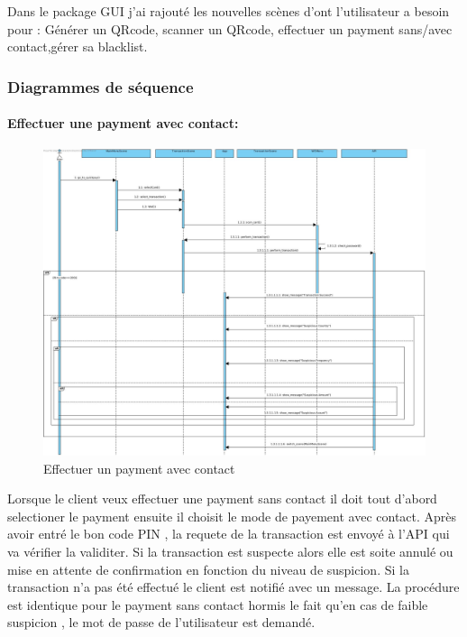 \documentclass[../rapport.tex]{subfiles}
\begin{document}
		\bigskip
        Dans le package GUI j'ai rajouté les nouvelles scènes d'ont l'utilisateur a besoin pour :
        Générer un QRcode, scanner un QRcode, effectuer un payment sans/avec contact,gérer sa blacklist.
		
		\subsubsection{Diagrammes de séquence}
				\paragraph{Effectuer une payment avec contact:}
						\begin{figure}[h!]
								\centering\includegraphics[scale=0.3]{ressources/photos_diagrammes/extensionChristian/interactionapp1/Effecteur_un_payement_avec_contact.jpg}
								\caption{ Effectuer un payment avec contact}
						\end{figure}
					Lorsque le client veux effectuer une payment sans contact il doit tout d'abord selectioner le payment ensuite il choisit
                    le mode de payement avec contact. Après avoir entré le bon code PIN , la  requete de la transaction est envoyé à l'API qui va vérifier la validiter.
                    Si la transaction est suspecte alors elle est soite annulé ou mise en attente de confirmation en fonction du niveau de suspicion.
					\medskip
					Si la transaction n'a pas été effectué le client est notifié avec un message.
                    La procédure est identique pour le payment sans contact hormis le fait qu'en cas de faible suspicion , le mot de passe de l'utilisateur est demandé.
\newpage
\end{document}
